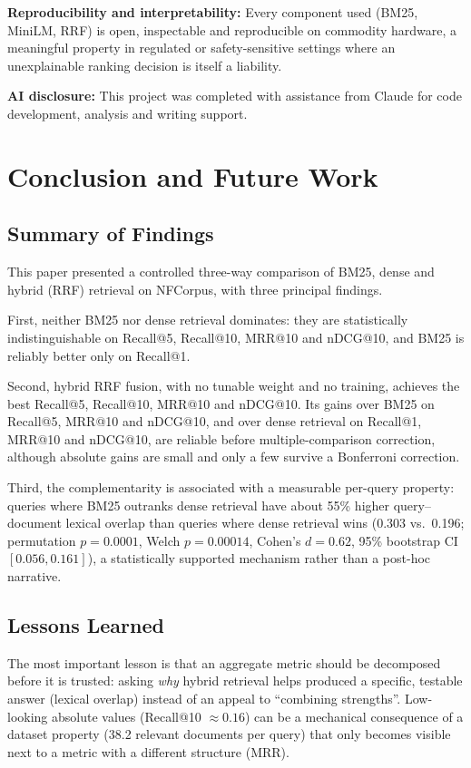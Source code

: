 \documentclass[10pt,letterpaper,twocolumn]{article}
\begin{document}
\textbf{Reproducibility and interpretability:} Every component used (BM25, MiniLM, RRF) is open, inspectable and reproducible on commodity hardware, a meaningful property in regulated or safety-sensitive settings where an unexplainable ranking decision is itself a liability.

\textbf{AI disclosure:} This project was completed with assistance from Claude for code development, analysis and writing support.

\section{Conclusion and Future Work}
\subsection{Summary of Findings}
This paper presented a controlled three-way comparison of BM25, dense and hybrid (RRF) retrieval on NFCorpus, with three principal findings.

First, neither BM25 nor dense retrieval dominates: they are statistically indistinguishable on Recall@5, Recall@10, MRR@10 and nDCG@10, and BM25 is reliably better only on Recall@1.

Second, hybrid RRF fusion, with no tunable weight and no training, achieves the best Recall@5, Recall@10, MRR@10 and nDCG@10. Its gains over BM25 on Recall@5, MRR@10 and nDCG@10, and over dense retrieval on Recall@1, MRR@10 and nDCG@10, are reliable before multiple-comparison correction, although absolute gains are small and only a few survive a Bonferroni correction.

Third, the complementarity is associated with a measurable per-query property: queries where BM25 outranks dense retrieval have about 55\% higher query--document lexical overlap than queries where dense retrieval wins (0.303 vs.\ 0.196; permutation $p=0.0001$, Welch $p=0.00014$, Cohen's $d=0.62$, 95\% bootstrap CI $[0.056,0.161]$), a statistically supported mechanism rather than a post-hoc narrative.

\subsection{Lessons Learned}
The most important lesson is that an aggregate metric should be decomposed before it is trusted: asking \emph{why} hybrid retrieval helps produced a specific, testable answer (lexical overlap) instead of an appeal to ``combining strengths''. Low-looking absolute values (Recall@10 $\approx0.16$) can be a mechanical consequence of a dataset property (38.2 relevant documents per query) that only becomes visible next to a metric with a different structure (MRR).
\end{document}

